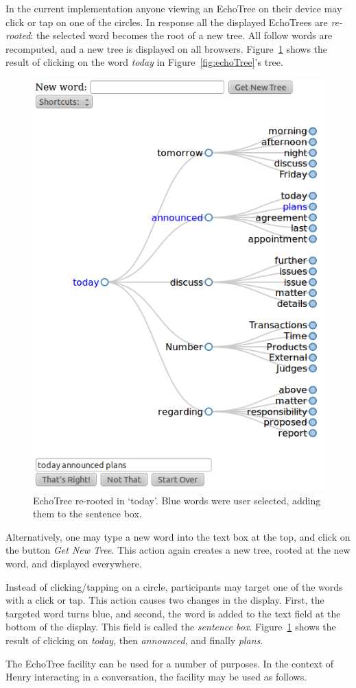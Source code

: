 \documentclass{sigchi}
\begin{document}
In the current implementation anyone viewing an EchoTree on their
device may click or tap on one of the circles. In response all the
displayed EchoTrees are {\em re-rooted}: the selected word becomes the
root of a new tree. All follow words are recomputed, and a new tree is
displayed on all browsers. Figure~\ref{fig:todayTree} shows the result
of clicking on the word {\em today} in Figure~\ref{fig:echoTree}'s
tree. 
\begin{figure}
   \centering
   \includegraphics[width=0.6\columnwidth]{Figs/echoTreeRootToday.png}
   \caption{EchoTree re-rooted in `today'. Blue words were user
     selected, adding them to the sentence box.}
   \label{fig:todayTree}
\end{figure}
Alternatively, one may type a new word into the text box at the top,
and click on the button {\em Get New Tree}. This action again creates
a new tree, rooted at the new word, and displayed everywhere.

Instead of clicking/tapping on a circle, participants may target one
of the words with a click or tap. This action causes two changes in
the display. First, the targeted word turns blue, and second, the word
is added to the text field at the bottom of the display. This field is
called the {\em sentence box}. Figure~\ref{fig:todayTree} shows the
result of clicking on {\em today}, then {\em announced}, and finally
{\em plans}.

The EchoTree facility can be used for a number of purposes. In the
context of Henry interacting in a conversation, the facility may be
used as follows. 
\end{document}
